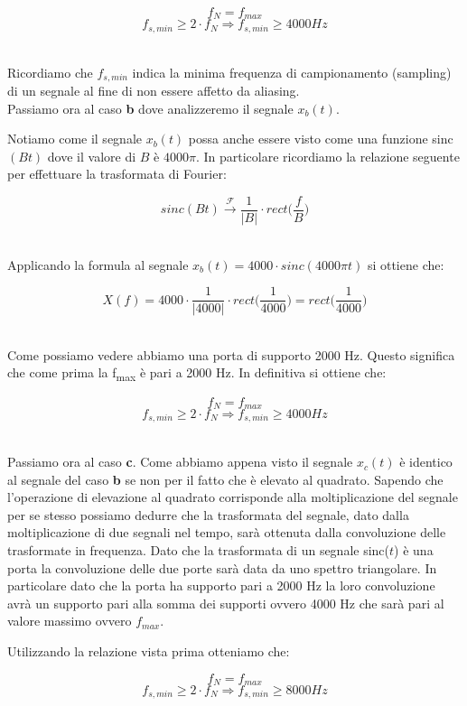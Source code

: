 \documentclass[../main.tex]{subfiles}
\begin{document}
\[f_N = f_{\unit{max}}\]
\[f_{\unit{s, min}} \geq 2 \cdot f_{N} \Rightarrow f_{\unit{s, min}} \geq 4000 \unit{Hz}\]\

Ricordiamo che $f_{\unit{s, min}}$ indica la minima frequenza di campionamento (sampling) di un segnale al fine di non essere affetto da aliasing.\\

Passiamo ora al caso \textbf{b} dove analizzeremo il segnale $x_b(t)$.

Notiamo come il segnale $x_b(t)$ possa anche essere visto come una funzione sinc$(Bt)$ dove il valore di $B$ è $4000\pi$.
In particolare ricordiamo la relazione seguente per effettuare la trasformata di Fourier:

\[ \unit{sinc}(Bt) \xrightarrow{\mathcal{F}} \frac{1}{|B|} \cdot \unit{rect}\bigg(\frac{f}{B} \bigg) \]\

Applicando la formula al segnale $x_b(t) = 4000 \cdot \unit{sinc}(4000 \pi t)$ si ottiene che:


\[ X(f) = 4000 \cdot \frac{1}{|4000|} \cdot \unit{rect} \bigg( \frac{1}{4000} \bigg) = \unit{rect} \bigg( \frac{1}{4000} \bigg) \]\

Come possiamo vedere abbiamo una porta di supporto 2000 Hz. Questo significa che come prima la \unit{f_{max}} è pari a 2000 Hz. In definitiva si ottiene che:

\[f_N = f_{\unit{max}}\]
\[f_{\unit{s, min}} \geq 2 \cdot f_{N} \Rightarrow f_{\unit{s, min}} \geq 4000 \unit{Hz}\]\

Passiamo ora al caso \textbf{c}.
Come abbiamo appena visto il segnale $x_c(t)$ è identico al segnale del caso \textbf{b} se non per il fatto che è elevato al quadrato.
Sapendo che l'operazione di elevazione al quadrato corrisponde alla moltiplicazione del segnale per se stesso possiamo dedurre che la trasformata del segnale, dato dalla moltiplicazione di due segnali nel tempo, sarà ottenuta dalla convoluzione delle trasformate in frequenza.
Dato che la trasformata di un segnale sinc($t$) è una porta la convoluzione delle due porte sarà data da uno spettro triangolare.
In particolare dato che la porta ha supporto pari a 2000 Hz la loro convoluzione avrà un supporto pari alla somma dei supporti ovvero 4000 Hz che sarà pari al valore massimo ovvero $f_{\unit{max}}$.

Utilizzando la relazione vista prima otteniamo che:


\[f_N = f_{\unit{max}}\]
\[f_{\unit{s, min}} \geq 2 \cdot f_{N} \Rightarrow f_{\unit{s, min}} \geq 8000 \unit{Hz}\]\
\end{document}
